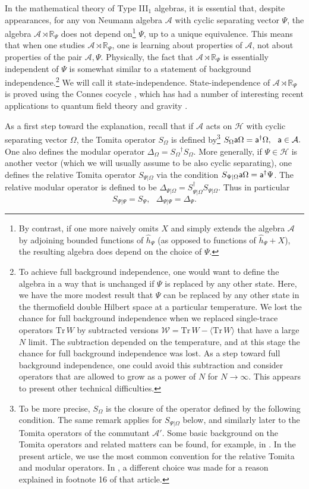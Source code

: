 \documentclass[11pt,a4paper]{article}
\def\a{{\sf a}}
\def\be{\begin{equation}}
\def\ee{\end{equation}}
\def\h{\widehat}
\def\A{{\mathcal A}}
\def\R{{\mathbb R}}
\def\h{\widehat}
\def\W{{\mathcal W}}
\def\la{\langle}
\def\ra{\rangle}
\def\H{{\mathcal H}}
\def\Tr{\mathrm{Tr}}
\begin{document}
In the mathematical theory of Type III$_1$ algebras, it is essential 
 that, despite appearances, for any von Neumann algebra $\A$ with cyclic separating vector $\Psi$,  the algebra 
 $\A\rtimes \R_\Psi$ does not depend on\footnote{By contrast, if one more naively omits $X$ and simply extends the algebra
 $\A$ by adjoining bounded functions of $\h h_\Psi$ (as opposed to functions of $\h h_\Psi+X$), the resulting algebra does depend on the choice of $\Psi$.}   $\Psi$, up to a unique equivalence.   This means that when one
studies $\A\rtimes \R_\Psi$, one is learning about properties of $\A$, not about properties of the pair $\A,\Psi$.   Physically,  the fact
that $\A\rtimes\R_\Psi$  is essentially  independent of $\Psi$  is somewhat similar to a statement of background independence.\footnote{To achieve full
background independence, one would want to define the algebra in a way that is unchanged if $\Psi$ is replaced by any other state.   Here, we have the more
modest result that $\Psi$ can be replaced by any other state in the thermofield double Hilbert space at a particular temperature.   We lost the chance for full
background independence when we replaced single-trace operators $\Tr\,W$ by subtracted versions $\W=\Tr\,W-\la \Tr\,W\ra$ that have a large $N$ limit.  The subtraction depended on the temperature, and at this stage the chance for full background independence was lost.   As a step toward full background independence,
one could avoid this subtraction and consider operators that are allowed to grow as a power of $N$ for $N\to\infty$.   This appears to present other technical
difficulties.}   We will call it state-independence.
State-independence of  $\A\rtimes\R_\Psi$  is proved using the Connes cocycle \cite{Connes}, which has had a number of interesting
recent applications to quantum field theory and gravity \cite{FC,Lashkari,Bousso,BoussoTwo}. 

As a first step toward the explanation, recall that 
if $\A$ acts on $\H$ with cyclic separating vector $\Omega$, the Tomita operator $S_\Omega$ is  defined by\footnote{To be more precise, $S_\Omega$ is the closure
of the operator defined by the following condition. The same remark applies for $S_{\Psi|\Omega}$ below, and similarly later to the Tomita operators of the commutant
$\A'$.  Some basic background on the Tomita operators and related matters can be found, for example, in \cite{OlderLectures}.   In the present article,
we use the most common convention for the relative Tomita and modular operators.   In \cite{OlderLectures}, a different choice was made for a reason explained in footnote
16 of that article.}  
$S_\Omega\a\Omega=\a^\dagger\Omega,~~\a\in\A.$
   One also defines the modular operator $\Delta_\Omega=S_\Omega{}^\dagger S_\Omega$.    More generally, if $\Psi\in\H$ is another vector (which we will usually
   assume to be also cyclic separating),
one defines the relative Tomita operator $S_{\Psi|\Omega}$ via the condition 
$S_{\Psi|\Omega}\a\Omega=\a^\dagger\Psi$.   The relative modular operator is defined to be
$\Delta_{\Psi|\Omega}=S_{\Psi|\Omega}^\dagger S_{\Psi|\Omega}$.   Thus in particular 
\be\label{zombo} S_{\Psi|\Psi}=S_\Psi,~~~ \Delta_{\Psi|\Psi}=\Delta_\Psi.\ee
\end{document}
